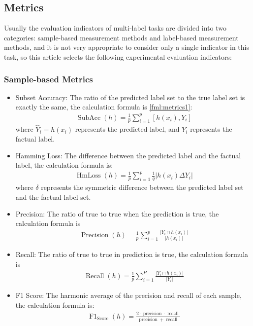 \subsection{Metrics}
Usually the evaluation indicators of multi-label tasks are divided into two categories: sample-based measurement methods and label-based measurement methods, and it is not very appropriate to consider only a single indicator in this task, so this article selects the following experimental evaluation indicators:
\subsubsection{Sample-based Metrics}
\begin{itemize}
	\item Subset Accuracy: The ratio of the predicted label set to the true label set is exactly the same, the calculation formula is \ref{fml:metrics1}:
	      \begin{align}
		      \operatorname{SubAcc}(h)=\frac{1}{p} \sum_{i=1}^{p}\left[{h}\left(x_{i}\right), Y_{i}\right] \label{fml:metrics1}
	      \end{align}
	      where $\hat{Y}_i=h(x_i)$ represents the predicted label, and $Y_i$ represents the factual label.
	\item Hamming Loss: The difference between the predicted label and the factual label, the calculation formula is:
	      \begin{align}
		      \operatorname{HmLoss}(h)=\frac{1}{p} \sum_{i=1}^{p} \frac{1}{q}\left|h\left(x_{i}\right) \Delta Y_{i}\right|
	      \end{align}
	      where $\delta$ represents the symmetric difference between the predicted label set and the factual label set.
	\item Precision: The ratio of true to true when the prediction is true, the calculation formula is
	      \begin{align}
		      \operatorname{ Precision }(h)=\frac{1}{p} \sum_{i=1}^{p} \frac{\left|Y_{i} \cap h\left(x_{i}\right)\right|}{\left|h\left(x_{i}\right)\right|}
	      \end{align}
	\item Recall: The ratio of true to true in prediction is true, the calculation formula is
	      \begin{align}
		      \operatorname{Recall}(h)=\frac{1}{p} \sum_{i=1}^{P} \frac{\left|Y_{i} \cap h\left(x_{i}\right)\right|}{\left|Y_{i}\right|}
	      \end{align}
	\item F1 Score: The harmonic average of the precision and recall of each sample, the calculation formula is:
	      \begin{align}
		      \operatorname{F1}_{\text{Score}}(h)=\frac{2 \cdot \operatorname{precision} \cdot \operatorname {recall }}{\operatorname {precision }+\operatorname {recall }}
	      \end{align}

\end{itemize}




